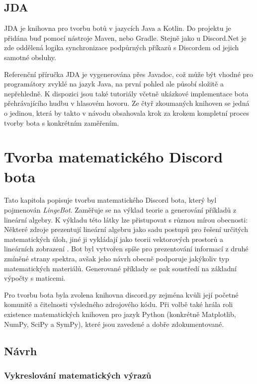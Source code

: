 \documentclass[FM]{tulthesis}
\begin{document}
	\section{JDA}
	
	JDA je knihovna pro tvorbu botů v jazycích Java a Kotlin. Do projektu je přidána buď pomocí nástroje Maven, nebo Gradle. Stejně jako u Discord.Net je zde oddělená logika synchronizace podpůrných příkazů s Discordem od jejich samotné obsluhy.
	
	Referenční příručka JDA je vygenerována přes Javadoc, což může být vhodné pro programátory zvyklé na jazyk Java, na první pohled ale působí složitě a nepřehledně. K dispozici jsou také tutoriály včetně ukázkové implementace bota přehrávajícího hudbu v hlasovém hovoru. Ze čtyř zkoumaných knihoven se jedná o jedinou, která by takto v návodu obsahovala krok za krokem kompletní proces tvorby bota s konkrétním zaměřením.
	
	\chapter{Tvorba matematického Discord bota}\label{Chapter5}
	
	Tato kapitola popisuje tvorbu matematického Discord bota, který byl pojmenován \textit{LingeBot}. Zaměřuje se na výklad teorie a generování příkladů z lineární algebry. K výkladu této látky lze přistupovat s různou mírou obecnosti: Některé zdroje prezentují lineární algebru jako sadu postupů pro řešení určitých matematických úloh, jiné ji vykládají jako teorii vektorových prostorů a lineárních zobrazení \cite{lit_lingebra}. Bot byl vytvořen spíše pro prezentování informací z druhé zmíněné strany spektra, avšak jeho návrh obecně podporuje jakýkoliv typ matematických materiálů. Generované příklady se pak soustředí na základní výpočty s maticemi.
	
	Pro tvorbu bota byla zvolena knihovna discord.py zejména kvůli její početné komunitě a čitelnosti výsledného zdrojového kódu. Při volbě také hrála roli existence matematických knihoven pro jazyk Python (konkrétně Matplotlib, NumPy, SciPy a SymPy), které jsou zavedené a dobře zdokumentované.
		
	\section{Návrh}
	
	\subsection{Vykreslování matematických výrazů}
	
\end{document}
